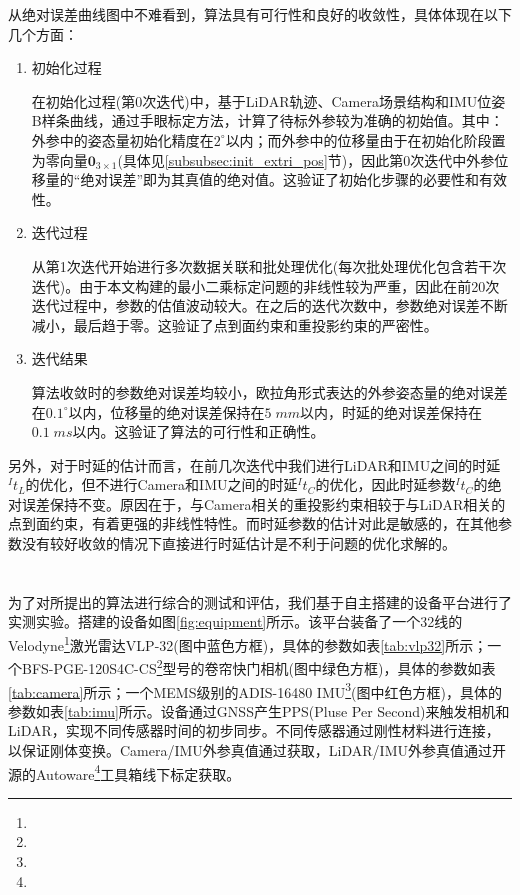从绝对误差曲线图中不难看到，算法具有可行性和良好的收敛性，具体体现在以下几个方面：
\begin{enumerate}
  \item 初始化过程

        在初始化过程(第0次迭代)中，基于LiDAR轨迹、Camera场景结构和IMU位姿B样条曲线，通过手眼标定方法，计算了待标外参较为准确的初始值。其中：外参中的姿态量初始化精度在$2^\circ$以内；而外参中的位移量由于在初始化阶段置为零向量$\boldsymbol{0}_{3\times 1}$(具体见\ref{subsubsec:init_extri_pos}节)，因此第0次迭代中外参位移量的“绝对误差”即为其真值的绝对值。这验证了初始化步骤的必要性和有效性。

  \item 迭代过程

        从第1次迭代开始进行多次数据关联和批处理优化(每次批处理优化包含若干次迭代)。由于本文构建的最小二乘标定问题的非线性较为严重，因此在前20次迭代过程中，参数的估值波动较大。在之后的迭代次数中，参数绝对误差不断减小，最后趋于零。这验证了点到面约束和重投影约束的严密性。

  \item 迭代结果

        算法收敛时的参数绝对误差均较小，欧拉角形式表达的外参姿态量的绝对误差在$0.1^\circ$以内，位移量的绝对误差保持在$5\;mm$以内，时延的绝对误差保持在$0.1\;ms$以内。这验证了算法的可行性和正确性。
\end{enumerate}

另外，对于时延的估计而言，在前几次迭代中我们进行LiDAR和IMU之间的时延${^{I}t_{L}}$的优化，但不进行Camera和IMU之间的时延${^{I}t_{C}}$的优化，因此时延参数${^{I}t_{C}}$的绝对误差保持不变。原因在于，与Camera相关的重投影约束相较于与LiDAR相关的点到面约束，有着更强的非线性特性。而时延参数的估计对此是敏感的，在其他参数没有较好收敛的情况下直接进行时延估计是不利于问题的优化求解的。

\section{}
\label{sec:exp_real_world}
\subsection{}

为了对所提出的算法进行综合的测试和评估，我们基于自主搭建的设备平台进行了实测实验。搭建的设备如图\ref{fig:equipment}所示。该平台装备了一个32线的Velodyne\footnote{}激光雷达VLP-32(图中蓝色方框)，具体的参数如表\ref{tab:vlp32}所示；一个BFS-PGE-120S4C-CS\footnote{}型号的卷帘快门相机(图中绿色方框)，具体的参数如表\ref{tab:camera}所示；一个MEMS级别的ADIS-16480  IMU\footnote{}(图中红色方框)，具体的参数如表\ref{tab:imu}所示。设备通过GNSS产生PPS(Pluse Per Second)来触发相机和LiDAR，实现不同传感器时间的初步同步。不同传感器通过刚性材料进行连接，以保证刚体变换。Camera/IMU外参真值通过\cite{li2022accurate}获取，LiDAR/IMU外参真值通过开源的Autoware\footnote{}工具箱线下标定获取。

